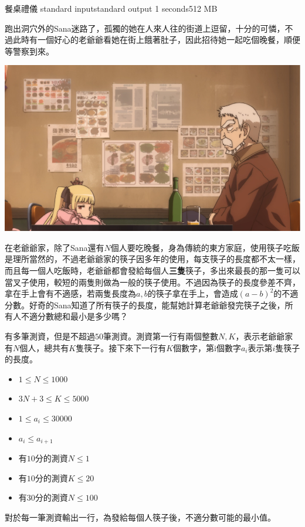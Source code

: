 \gdef\thisproblemauthor{}
\gdef\thisproblemdeveloper{}
\gdef\thisproblemorigin{}
\begin{problem}{餐桌禮儀}
{standard input}{standard output}
{1 seconds}{512 MB}{}

跑出洞穴外的Sana迷路了，孤獨的她在人來人往的街道上逗留，十分的可憐，不過此時有一個好心的老爺爺看她在街上餓著肚子，因此招待她一起吃個晚餐，順便等警察到來。

\centerline{\includegraphics[scale=0.4]{./pics/C.png}}

在老爺爺家，除了Sana還有$N$個人要吃晚餐，身為傳統的東方家庭，使用筷子吃飯是理所當然的，不過老爺爺家的筷子因多年的使用，每支筷子的長度都不太一樣，而且每一個人吃飯時，老爺爺都會發給每個人\textbf{三隻}筷子，多出來最長的那一隻可以當叉子使用，較短的兩隻則做為一般的筷子使用。不過因為筷子的長度參差不齊，拿在手上會有不適感，若兩隻長度為$a,b$的筷子拿在手上，會造成$(a-b)^2$的不適分數。好奇的Sana知道了所有筷子的長度，能幫她計算老爺爺發完筷子之後，所有人不適分數總和最小是多少嗎？

\InputFile

有多筆測資，但是不超過$50$筆測資。測資第一行有兩個整數$N,K$，表示老爺爺家有$N$個人，總共有$K$隻筷子。接下來下一行有$K$個數字，第i個數字$a_i$表示第$i$隻筷子的長度。

\begin{iofmt}
\begin{itemize}
	\item $1\leq N \leq 1000$
	\item $3N+3\leq K \leq 5000$
	\item $1 \leq a_i \leq 30000$
	\item $a_i \leq a_{i+1}$
	\item 有$10$分的測資$N\leq 1$
	\item 有$10$分的測資$K\leq 20$
	\item 有$30$分的測資$N\leq 100$
\end{itemize}
\end{iofmt}

\OutputFile

對於每一筆測資輸出一行，為發給每個人筷子後，不適分數可能的最小值。

\Examples

\begin{example}
%
\end{example}


\end{problem}
